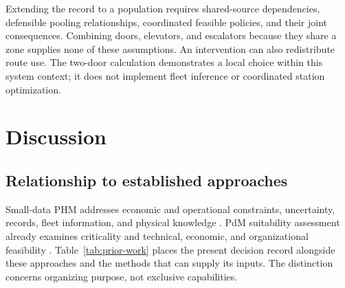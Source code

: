 \documentclass[symmetry,article,submit,pdftex,oneauthor]{Definitions/mdpi}
\begin{document}
Extending the record to a population requires shared-source dependencies, defensible pooling relationships, coordinated feasible policies, and their joint consequences. Combining doors, elevators, and escalators because they share a zone supplies none of these assumptions. An intervention can also redistribute route use. The two-door calculation demonstrates a local choice within this system context; it does not implement fleet inference or coordinated station optimization.


\section{Discussion}
\label{sec:discussion}

\subsection{Relationship to established approaches}

Small-data PHM addresses economic and operational constraints, uncertainty, records, fleet information, and physical knowledge \citep{Li2024SmallDataPHM}. PdM suitability assessment already examines criticality and technical, economic, and organizational feasibility \citep{Tiddens2018PdMSelection}. Table~\ref{tab:prior-work} places the present decision record alongside these approaches and the methods that can supply its inputs. The distinction concerns organizing purpose, not exclusive capabilities.
\end{document}
